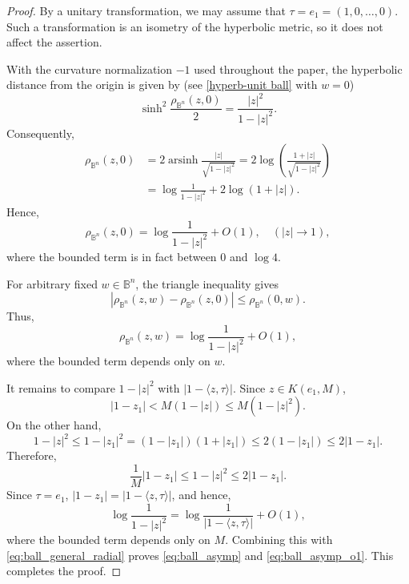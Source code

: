 \documentclass[12pt]{amsart}
\numberwithin{equation}{section}
\theoremstyle{plain}
\theoremstyle{definition}
\begin{document}
\begin{proof}
By a unitary transformation, we may assume that
$\tau=e_1=(1,0,\ldots,0)$. Such a transformation is an isometry of the
hyperbolic metric, so it does not affect the assertion.

With the curvature normalization $-1$ used throughout the paper, the
hyperbolic distance from the origin is given by (see \eqref{hyperb-unit ball} with $w=0$)
\begin{equation*}
\label{eq:ball_origin_distance}
\sinh^2
\frac{\rho_{\mathbb B^n}(z,0)}{2}
=
\frac{|z|^2}{1-|z|^2}.
\end{equation*}
Consequently,
\begin{align*}
\rho_{\mathbb B^n}(z,0)
&=
2\operatorname{arsinh}
\frac{|z|}{\sqrt{1-|z|^2}}
=
2\log
\left(
\frac{1+|z|}{\sqrt{1-|z|^2}}
\right)
\\
&=
\log\frac{1}{1-|z|^2}
+
2\log(1+|z|).
\label{eq:ball_origin_asymp}
\end{align*}
Hence,
\begin{equation*}
\label{eq:ball_origin_o1}
\rho_{\mathbb B^n}(z,0)
=
\log\frac{1}{1-|z|^2}
+
O(1),
\quad
(|z|\to1),
\end{equation*}
where the bounded term is in fact between $0$ and $\log4$.

For arbitrary fixed $w\in\mathbb B^n$, the triangle inequality gives
\begin{equation*}
\left|
\rho_{\mathbb B^n}(z,w)
-
\rho_{\mathbb B^n}(z,0)
\right|
\le
\rho_{\mathbb B^n}(0,w).
\end{equation*}
Thus,
\begin{equation}
\label{eq:ball_general_radial}
\rho_{\mathbb B^n}(z,w)
=
\log\frac{1}{1-|z|^2}
+
O(1),
\end{equation}
where the bounded term depends only on $w$.

It remains to compare $1-|z|^2$ with
$|1-\langle z,\tau\rangle|$. Since $z\in K(e_1,M)$,
\begin{equation*}
\label{eq:ball_upper_comparison}
|1-z_1|
<
M(1-|z|)
\le
M(1-|z|^2).
\end{equation*}
On the other hand,
\begin{equation*}
1-|z|^2
\le
1-|z_1|^2
=
(1-|z_1|)(1+|z_1|)
\le
2(1-|z_1|)
\le
2|1-z_1|.
\end{equation*}
Therefore,
\begin{equation*}
\label{eq:ball_comparability}
\frac{1}{M}|1-z_1|
\le
1-|z|^2
\le
2|1-z_1|.
\end{equation*}
Since $\tau=e_1$,
$|1-z_1|=|1-\langle z,\tau\rangle|$, and hence,
\begin{equation*}
\log\frac{1}{1-|z|^2}
=
\log\frac{1}{|1-\langle z,\tau\rangle|}
+
O(1),
\end{equation*}
where the bounded term depends only on $M$. Combining this with
\eqref{eq:ball_general_radial} proves
\eqref{eq:ball_asymp} and \eqref{eq:ball_asymp_o1}. This completes the proof.
\end{proof}
\end{document}
